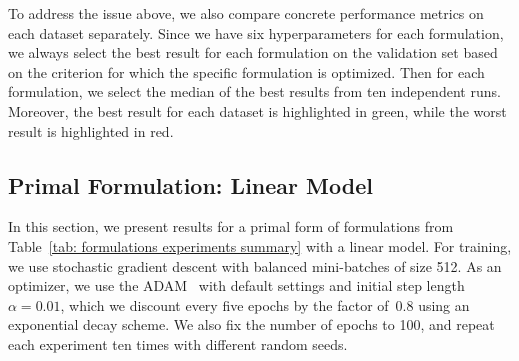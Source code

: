 To address the issue above, we also compare concrete performance metrics on each dataset separately. Since we have six hyperparameters for each formulation, we always select the best result for each formulation on the validation set based on the criterion for which the specific formulation is optimized. Then for each formulation, we select the median of the best results from ten independent runs. Moreover, the best result for each dataset is highlighted in green, while the worst result is highlighted in red.


\subsection{Primal Formulation: Linear Model}\label{sec: results primal linear}

In this section, we present results for a primal form of formulations from Table~\ref{tab: formulations experiments summary} with a linear model. For training, we use stochastic gradient descent with balanced mini-batches of size 512. As an optimizer, we use the ADAM~\cite{kingma2014adam} with default settings and initial step length~$\alpha = 0.01$, which we discount every five epochs by the factor of~$0.8$ using an exponential decay scheme. We also fix the number of epochs to 100, and repeat each experiment ten times with different random seeds.

